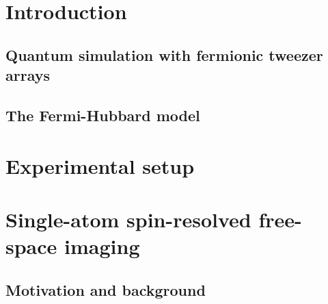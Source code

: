 \documentclass[twoside]{article}
\begin{document}








\newpage
\section{Introduction} \label{sec:intro}
\subsection{Quantum simulation with fermionic tweezer arrays}

\subsection{The Fermi-Hubbard model} \label{subsec:exp-setup-fh}




\newpage
\section{Experimental setup} \label{sec:exp-setup}





\newpage
\section{Single-atom spin-resolved free-space imaging} \label{sec:imaging}

\subsection{Motivation and background} \label{subsec:imaging-motivation}
\end{document}
